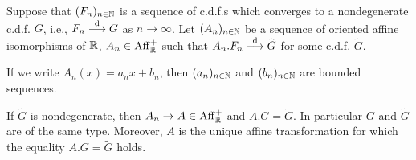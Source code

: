 \begin{theorem}
  \label{thm:convergence-to-types}
  Suppose that $(F_n)_{n \in \mathbb{N}}$ is a sequence of
  c.d.f.s which converges to a nondegenerate c.d.f. $G$, i.e.,
  $F_n \overset{\mathrm{d}}{\longrightarrow} G$ as $n \to \infty$.
  Let $(A_n)_{n \in \mathbb{N}}$ be a sequence of oriented
  affine isomorphisms of $\mathbb{R}$, $A_n \in \mathrm{Aff}^+_{\mathbb{R}}$
  such that $A_n.F_n \overset{\mathrm{d}}{\longrightarrow} \widetilde{G}$ for some c.d.f.
  $\widetilde{G}$.

  If we write $A_n(x) = a_n x + b_n$, then $(a_n)_{n \in \mathbb{N}}$
  and $(b_n)_{n \in \mathbb{N}}$ are bounded sequences.

  If $\widetilde{G}$ is nondegenerate, then
  $A_n \to A \in \mathrm{Aff}^+_{\mathbb{R}}$ and $A.G = \widetilde{G}$.
  In particular $G$ and $\widetilde{G}$ are of the same type.
  Moreover, $A$ is the unique affine transformation for which
  the equality $A.G = \widetilde{G}$ holds.
\end{theorem}

